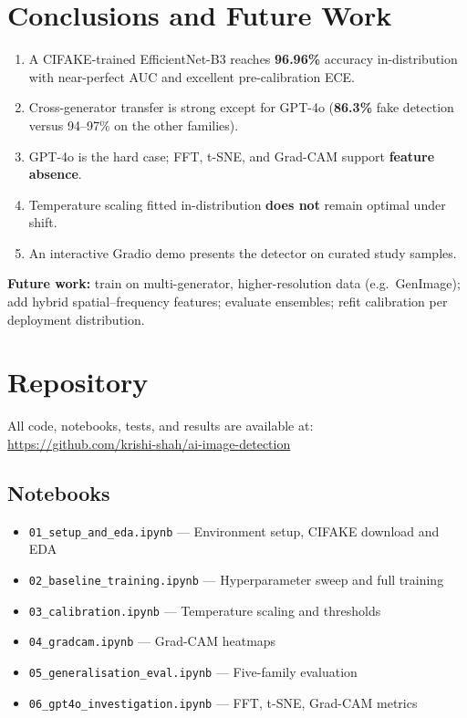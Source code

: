 \documentclass[12pt,a4paper]{article}
\begin{document}
\section{Conclusions and Future Work}

\begin{enumerate}[noitemsep]
    \item A CIFAKE-trained EfficientNet-B3 reaches \textbf{96.96\%} accuracy in-distribution with near-perfect AUC and excellent pre-calibration ECE.
    \item Cross-generator transfer is strong except for GPT-4o (\textbf{86.3\%} fake detection versus 94--97\% on the other families).
    \item GPT-4o is the hard case; FFT, t-SNE, and Grad-CAM support \textbf{feature absence}.
    \item Temperature scaling fitted in-distribution \textbf{does not} remain optimal under shift.
    \item An interactive Gradio demo presents the detector on curated study samples.
\end{enumerate}

\noindent\textbf{Future work:} train on multi-generator, higher-resolution data (e.g.\ GenImage); add hybrid spatial--frequency features; evaluate ensembles; refit calibration per deployment distribution.

\section{Repository}

All code, notebooks, tests, and results are available at:\\
\url{https://github.com/krishi-shah/ai-image-detection}

\subsection*{Notebooks}
\begin{itemize}[noitemsep]
    \item \texttt{01\_setup\_and\_eda.ipynb} --- Environment setup, CIFAKE download and EDA
    \item \texttt{02\_baseline\_training.ipynb} --- Hyperparameter sweep and full training
    \item \texttt{03\_calibration.ipynb} --- Temperature scaling and thresholds
    \item \texttt{04\_gradcam.ipynb} --- Grad-CAM heatmaps
    \item \texttt{05\_generalisation\_eval.ipynb} --- Five-family evaluation
    \item \texttt{06\_gpt4o\_investigation.ipynb} --- FFT, t-SNE, Grad-CAM metrics
\end{itemize}
\end{document}
